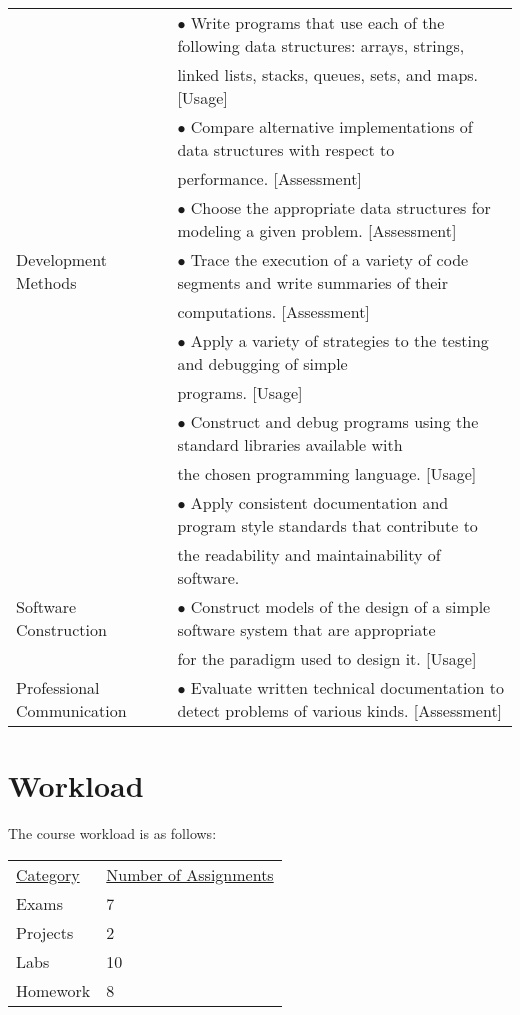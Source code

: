 \documentclass[10pt]{article}
\begin{document}
\begin{longtable}{|p{1.5in}|p{5.25in}|}
 & \(\bullet\) Write programs that use each of the following data structures: arrays, strings,\\
 & linked lists, stacks, queues, sets, and maps. [Usage]\\
 & \(\bullet\) Compare alternative implementations of data structures with respect to\\
 & performance. [Assessment]\\
 & \(\bullet\) Choose the appropriate data structures for modeling a given problem. [Assessment]\\
\hline
Development Methods & \(\bullet\) Trace the execution of a variety of code segments and write summaries of their\\
 & computations. [Assessment]\\
 & \(\bullet\) Apply a variety of strategies to the testing and debugging of simple\\
 & programs. [Usage]\\
 & \(\bullet\) Construct and debug programs using the standard libraries available with\\
 & the chosen programming language. [Usage]\\
 & \(\bullet\) Apply consistent documentation and program style standards that contribute to\\
 & the readability and maintainability of software.\\
\hline
Software Construction & \(\bullet\) Construct models of the design of a simple software system that are appropriate\\
 & for the paradigm used to design it. [Usage]\\
\hline
Professional Communication & \(\bullet\) Evaluate written technical documentation to detect problems of various kinds. [Assessment]\\
\hline
\end{longtable}
\normalsize

\section{Workload}

The course workload is as follows:
\begin{center}
  \begin{tabular}{ll}
    \underline{Category} & \underline{Number of Assignments} \\
    Exams & 7 \\
    Projects & 2 \\
    Labs & 10 \\
    Homework & 8
  \end{tabular}
\end{center}
\end{document}
